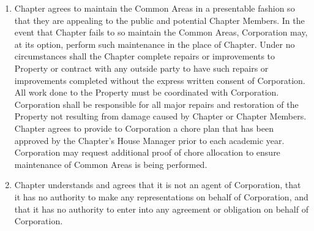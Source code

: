 \documentclass[12pt]{article}
\begin{document}
\begin{enumerate}
        \item Chapter agrees to maintain the Common Areas in a presentable fashion so that they are appealing to the public and potential Chapter Members.
                In the event that Chapter fails to so maintain the Common Areas, Corporation may, at its option, perform such maintenance in the place of Chapter.
                Under no circumstances shall the Chapter complete repairs or improvements to Property or contract with any outside party to have such repairs or improvements completed without the express written consent of Corporation.
                All work done to the Property must be coordinated with Corporation.
                Corporation shall be responsible for all major repairs and restoration of the Property not resulting from damage caused by Chapter or Chapter Members.
                Chapter agrees to provide to Corporation a chore plan that has been approved by the Chapter's House Manager prior to each academic year.
                Corporation may request additional proof of chore allocation to ensure maintenance of Common Areas is being performed.

        \item Chapter understands and agrees that it is not an agent of Corporation, that it has no authority to make any representations on behalf of Corporation, and that it has no authority to enter into any agreement or obligation on behalf of Corporation.


\end{enumerate}
\end{document}
